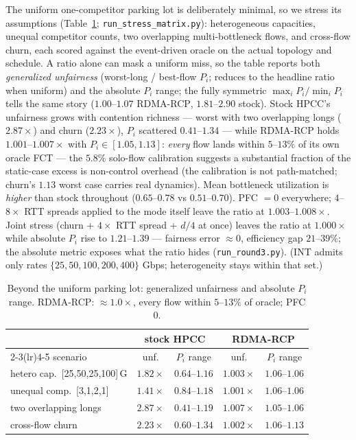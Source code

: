 \documentclass[sigconf, nonacm]{acmart}
\newcommand{\hpccfs}{\textsc{RDMA-RCP}\xspace}
\begin{document}
The uniform one-competitor parking lot is deliberately minimal, so we stress its assumptions
(Table~\ref{tab:hetero}; \texttt{run\_stress\_matrix.py}): heterogeneous capacities, unequal
competitor counts, two overlapping multi-bottleneck flows, and cross-flow churn, each
scored against the event-driven oracle on the actual topology and schedule.
A ratio alone can mask a uniform miss, so the table reports both \emph{generalized
unfairness} (worst-long / best-flow $P_i$; reduces to the headline ratio when uniform) and the
absolute $P_i$ range; the fully symmetric
$\max_i P_i / \min_i P_i$ tells the same story ($1.00$--$1.07$ \hpccfs, $1.81$--$2.90$
stock).
Stock HPCC's unfairness grows with contention richness --- worst with two overlapping longs
($2.87\times$) and churn ($2.23\times$), $P_i$ scattered $0.41$--$1.34$ --- while \hpccfs
holds
$1.001$--$1.007\times$ with $P_i \in [1.05, 1.13]$: \emph{every} flow lands within
$5$--$13\%$ of its own oracle FCT --- the $5.8\%$ solo-flow calibration
suggests a substantial fraction of the static-case excess is non-control overhead (the
calibration is not path-matched; churn's $1.13$ worst case carries real dynamics). Mean
bottleneck utilization is \emph{higher} than stock throughout ($0.65$--$0.78$ vs
$0.51$--$0.70$). PFC $= 0$ everywhere; $4$--$8\times$ RTT spreads applied to the mode itself
leave the ratio at $1.003$--$1.008\times$. Joint stress (churn + $4\times$ RTT spread + $d/4$ at once) leaves the ratio at
$1.000\times$ while absolute $P_i$ rise to $1.21$--$1.39$ --- fairness error ${\approx}0$,
efficiency gap $21$--$39\%$; the absolute metric exposes what the ratio hides
(\texttt{run\_round3.py}). (INT admits only rates $\{25,50,100,200,400\}$ Gbps; heterogeneity stays within that
set.)

\begin{table}[t]
\caption{Beyond the uniform parking lot: generalized unfairness and absolute $P_i$ range.
\hpccfs: ${\approx}1.0\times$, every flow within $5$--$13\%$ of oracle; PFC 0.}
\label{tab:hetero}
\centering\small
\begin{tabular}{lcccc}
\toprule
 & \multicolumn{2}{c}{stock HPCC} & \multicolumn{2}{c}{\hpccfs} \\
\cmidrule(lr){2-3}\cmidrule(lr){4-5}
scenario & unf. & $P_i$ range & unf. & $P_i$ range \\
\midrule
hetero cap.\ [25,50,25,100]\,G & $1.82\times$ & $0.64$--$1.16$ & $\mathbf{1.003\times}$ & $1.06$--$1.06$ \\
unequal comp.\ [3,1,2,1] & $1.41\times$ & $0.84$--$1.18$ & $\mathbf{1.001\times}$ & $1.06$--$1.06$ \\
two overlapping longs & $2.87\times$ & $0.41$--$1.19$ & $\mathbf{1.007\times}$ & $1.05$--$1.06$ \\
cross-flow churn & $2.23\times$ & $0.60$--$1.34$ & $\mathbf{1.002\times}$ & $1.06$--$1.13$ \\
\bottomrule
\end{tabular}
\end{table}
\end{document}
